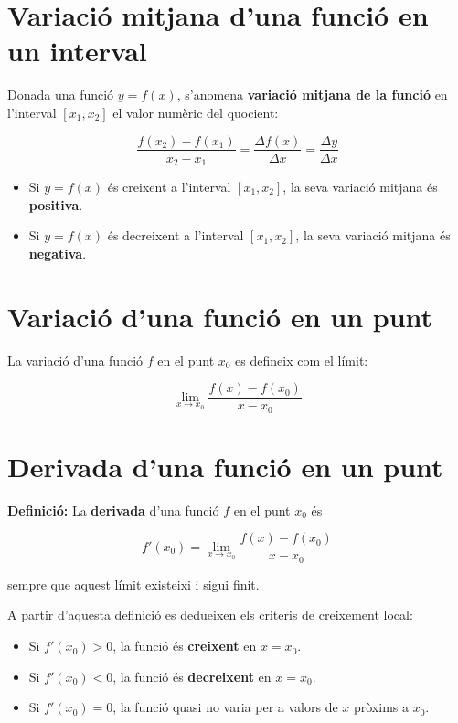 \section{Variació mitjana d'una funció en un interval}

Donada una funció $y = f(x)$, s'anomena \textbf{variació mitjana de la funció} en l'interval $[x_1, x_2]$ el valor numèric del quocient:

\begin{equation*}
\frac{f(x_2) - f(x_1)}{x_2 - x_1} = \frac{\Delta f(x)}{\Delta x} = \frac{\Delta y}{\Delta x}
\end{equation*}

\begin{itemize}
\item Si $y = f(x)$ és creixent a l'interval $[x_1, x_2]$, la seva variació mitjana és \textbf{positiva}.
\item Si $y = f(x)$ és decreixent a l'interval $[x_1, x_2]$, la seva variació mitjana és \textbf{negativa}.
\end{itemize}

\section{Variació d'una funció en un punt}

La variació d'una funció $f$ en el punt $x_0$ es defineix com el límit:

\begin{equation*}
\lim_{x\to x_0} \frac{f(x) - f(x_0)}{x - x_0}
\end{equation*}

\section{Derivada d'una funció en un punt}

\textbf{Definició:} La \textbf{derivada} d'una funció $f$ en el punt $x_0$ és

\begin{equation}
f'(x_0) = \lim_{x\to x_0} \frac{f(x) - f(x_0)}{x - x_0}
\end{equation}

sempre que aquest límit existeixi i sigui finit.

A partir d'aquesta definició es dedueixen els criteris de creixement local:

\begin{itemize}
\item Si $f'(x_0) > 0$, la funció és \textbf{creixent} en $x = x_0$.
\item Si $f'(x_0) < 0$, la funció és \textbf{decreixent} en $x = x_0$.
\item Si $f'(x_0) = 0$, la funció quasi no varia per a valors de $x$ pròxims a $x_0$.
\end{itemize}

